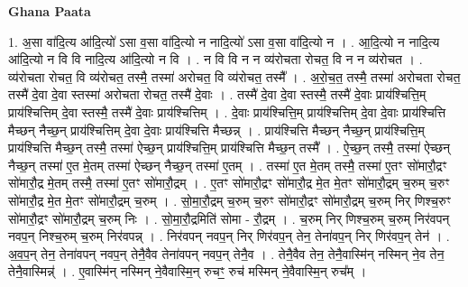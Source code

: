 \documentclass[17pt]{extarticle}
\begin{document}
\textbf{Ghana Paata } \newline

1. अ॒सा वा॑दि॒त्य आ॑दि॒त्यो॑ ऽसा व॒सा वा॑दि॒त्यो न नादि॒त्यो॑ ऽसा व॒सा वा॑दि॒त्यो न । . आ॒दि॒त्यो न नादि॒त्य आ॑दि॒त्यो न वि वि नादि॒त्य आ॑दि॒त्यो न वि । . न वि वि न न व्य॑रोचता रोचत॒ वि न न व्य॑रोचत । . व्य॑रोचता रोचत॒ वि व्य॑रोचत॒ तस्मै॒ तस्मा॑ अरोचत॒ वि व्य॑रोचत॒ तस्मै᳚ । . अ॒रो॒च॒त॒ तस्मै॒ तस्मा॑ अरोचता रोचत॒ तस्मै॑ दे॒वा दे॒वा स्तस्मा॑ अरोचता रोचत॒ तस्मै॑ दे॒वाः । . तस्मै॑ दे॒वा दे॒वा स्तस्मै॒ तस्मै॑ दे॒वाः प्राय॑श्चित्ति॒म् प्राय॑श्चित्तिम् दे॒वा स्तस्मै॒ तस्मै॑ दे॒वाः प्राय॑श्चित्तिम् । . दे॒वाः प्राय॑श्चित्ति॒म् प्राय॑श्चित्तिम् दे॒वा दे॒वाः प्राय॑श्चित्ति मैच्छन् नैच्छ॒न् प्राय॑श्चित्तिम् दे॒वा दे॒वाः प्राय॑श्चित्ति मैच्छन्न् । . प्राय॑श्चित्ति मैच्छन् नैच्छ॒न् प्राय॑श्चित्ति॒म् प्राय॑श्चित्ति मैच्छ॒न् तस्मै॒ तस्मा॑ ऐच्छ॒न् प्राय॑श्चित्ति॒म् प्राय॑श्चित्ति मैच्छ॒न् तस्मै᳚ । . ऐ॒च्छ॒न् तस्मै॒ तस्मा॑ ऐच्छन् नैच्छ॒न् तस्मा॑ ए॒त मे॒तम् तस्मा॑ ऐच्छन् नैच्छ॒न् तस्मा॑ ए॒तम् । . तस्मा॑ ए॒त मे॒तम् तस्मै॒ तस्मा॑ ए॒तꣳ सो॑मारौ॒द्रꣳ सो॑मारौ॒द्र मे॒तम् तस्मै॒ तस्मा॑ ए॒तꣳ सो॑मारौ॒द्रम् । . ए॒तꣳ सो॑मारौ॒द्रꣳ सो॑मारौ॒द्र मे॒त मे॒तꣳ सो॑मारौ॒द्रम् च॒रुम् च॒रुꣳ सो॑मारौ॒द्र मे॒त मे॒तꣳ सो॑मारौ॒द्रम् च॒रुम् । . सो॒मा॒रौ॒द्रम् च॒रुम् च॒रुꣳ सो॑मारौ॒द्रꣳ सो॑मारौ॒द्रम् च॒रुम् निर् णिश्च॒रुꣳ सो॑मारौ॒द्रꣳ सो॑मारौ॒द्रम् च॒रुम् निः । . सो॒मा॒रौ॒द्रमिति॑ सोमा - रौ॒द्रम् । . च॒रुम् निर् णिश्च॒रुम् च॒रुम् निर॑वपन् नवप॒न् निश्च॒रुम् च॒रुम् निर॑वपन्न् । . निर॑वपन् नवप॒न् निर् णिर॑वप॒न् तेन॒ तेना॑वप॒न् निर् णिर॑वप॒न् तेन॑ । . अ॒व॒प॒न् तेन॒ तेना॑वपन् नवप॒न् तेनै॒वैव तेना॑वपन् नवप॒न् तेनै॒व । . तेनै॒वैव तेन॒ तेनै॒वास्मि॑न् नस्मिन् ने॒व तेन॒ तेनै॒वास्मिन्न्॑ । . ए॒वास्मि॑न् नस्मिन् ने॒वैवास्मि॒न् रुचꣳ॒॒ रुच॑ मस्मिन् ने॒वैवास्मि॒न् रुच᳚म् । \newline
\end{document}
